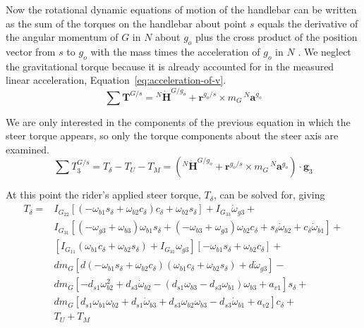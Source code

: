 \documentclass[10pt]{article}
\begin{document}
Now the rotational dynamic equations of motion of the handlebar can be written as the sum
of the torques on the handlebar about point $s$ equals the derivative of
the angular momentum of $G$ in $N$ about $g_o$ plus the cross product of the
position vector from $s$ to $g_o$ with the mass times the acceleration of $g_o$ in $N$
\cite{Meriam1975}. We neglect the gravitational torque because it is already
accounted for in the measured linear acceleration,
Equation~\ref{eq:acceleration-of-v}.
%
\begin{equation}
  \sum \mathbf{T}^{G/s} = {}^N\dot{\mathbf{H}}^{G/g_o} +
    \mathbf{r}^{g_o/s} \times m_G\,{}^N\mathbf{a}^{g_o}
\end{equation}

We are only interested in the components of the previous equation in which the
steer torque appears, so only the torque components about the steer axis are examined.
%
\begin{equation}
  \sum T^{G/s}_3 = T_\delta - T_U - T_M = \left({}^N\dot{\mathbf{H}}^{G/g_o} +
  \mathbf{r}^{g_o/s} \times m_G\,{}^N\mathbf{a}^{g_o}\right) \cdot \hat{\mathbf{g}}_3
\end{equation}

At this point the rider's applied steer torque, $T_\delta$, can be solved for,
giving
%
\begin{align}
  T_{\delta} =
    & I_{G_{22}} \left[ \left( -\omega_{b1} s_\delta + \omega_{b2} c_\delta \right)
      c_\delta + \omega_{b2} s_\delta \right] + I_{G_{33}} \dot{\omega}_{g3} + \nonumber \\
    & I_{G_{31}} \left[ (-\omega_{g3} + \omega_{b3} ) \omega_{b1} s_\delta +
      (-\omega_{b3} + \omega_{g3}) \omega_{b2} c_\delta +
      s_\delta \dot{\omega}_{b2} + c_\delta \dot{\omega}_{b1} \right] + \nonumber \\
    & \left[ I_{G_{11}} (\omega_{b1} c_\delta + \omega_{b2}s_\delta) +
      I_{G_{31}} \omega_{g3} \right] \left[-\omega_{b1} s_\delta +
      \omega_{b2} c_\delta \right] + \nonumber \\
    & d m_G \left[ d (-\omega_{b1} s_\delta + \omega_{b2} c_\delta)
      (\omega_{b1} c_\delta + \omega_{b2} s_\delta) + d \dot{\omega}_{g3} \right] - \nonumber \\
    & d m_G \left[-d_{s1} \omega_{b2}^{2} + d_{s3} \dot{\omega}_{b2} -
      (d_{s1} \omega_{b3} - d_{s3} \omega_{b1}) \omega_{b3} + a_{v1} \right] s_\delta + \nonumber \\
    & d m_G \left[d_{s1} \omega_{b1} \omega_{b2} + d_{s1} \dot{\omega}_{b3} +
      d_{s3} \omega_{b2} \omega_{b3} - d_{s3} \dot{\omega}_{b1} + a_{v2} \right]
      c_\delta + \nonumber \\
    & T_U + T_M
    \label{eq:steer-torque}
\end{align}
\end{document}
